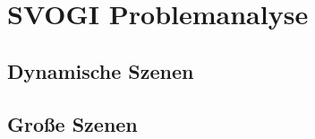 \chapter{\ac{SVOGI} Problemanalyse}
\label{chap:svogi-probs}

\section{Dynamische Szenen}
\blindtext

\section{Große Szenen}
\blindtext